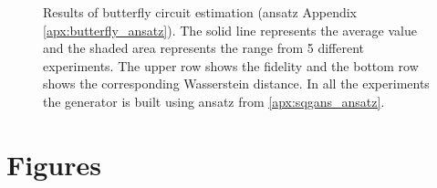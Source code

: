 \begin{figure}[htbp!]
  \caption{Results of butterfly circuit estimation (ansatz Appendix \ref{apx:butterfly_ansatz}).
    The solid line represents the average value and the shaded area
    represents the range from 5 different experiments. The upper row shows the
    fidelity and the bottom row shows the corresponding Wasserstein distance. In all the
    experiments the generator is built using ansatz from \ref{apx:sqgans_ansatz}.}
  \label{fig:wqgans_res_butterfly_3}
\end{figure}

\chapter{Figures}
